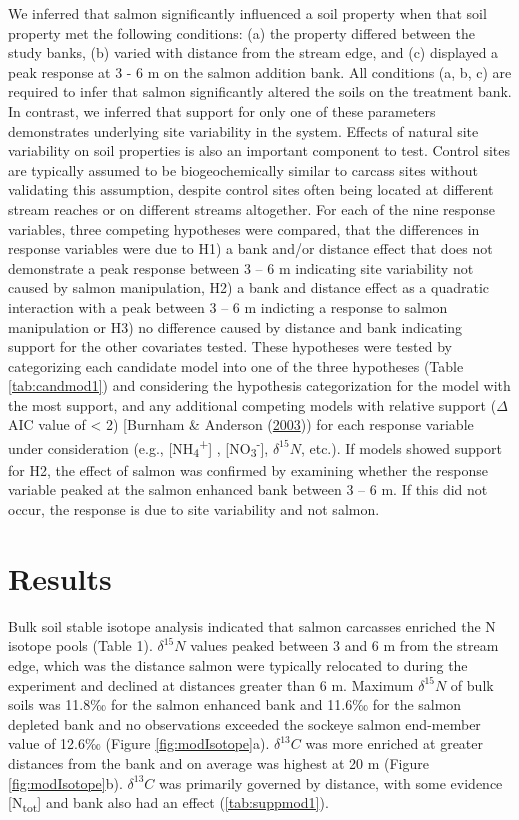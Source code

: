 \documentclass [11pt, proquest] {uwthesis}[2015/03/03]
\begin{document}
We inferred that salmon significantly influenced a soil property when
that soil property met the following conditions: (a) the property
differed between the study banks, (b) varied with distance from the
stream edge, and (c) displayed a peak response at 3 - 6 m on the salmon
addition bank. All conditions (a, b, c) are required to infer that
salmon significantly altered the soils on the treatment bank. In
contrast, we inferred that support for only one of these parameters
demonstrates underlying site variability in the system. Effects of
natural site variability on soil properties is also an important
component to test. Control sites are typically assumed to be
biogeochemically similar to carcass sites without validating this
assumption, despite control sites often being located at different
stream reaches or on different streams altogether. For each of the nine
response variables, three competing hypotheses were compared, that the
differences in response variables were due to H1) a bank and/or distance
effect that does not demonstrate a peak response between 3 -- 6 m
indicating site variability not caused by salmon manipulation, H2) a
bank and distance effect as a quadratic interaction with a peak between
3 -- 6 m indicting a response to salmon manipulation or H3) no
difference caused by distance and bank indicating support for the other
covariates tested. These hypotheses were tested by categorizing each
candidate model into one of the three hypotheses (Table
\ref{tab:candmod1}) and considering the hypothesis categorization for
the model with the most support, and any additional competing models
with relative support (\(\Delta\)AIC value of \textless{} 2) {[}Burnham
\& Anderson (\protect\hyperlink{ref-Burnham2003}{2003})) for each
response variable under consideration (e.g.,
{[}NH\textsubscript{4}\textsuperscript{+}{]} ,
{[}NO\textsubscript{3}\textsuperscript{-}{]}, \(\delta^{15}N\), etc.).
If models showed support for H2, the effect of salmon was confirmed by
examining whether the response variable peaked at the salmon enhanced
bank between 3 -- 6 m. If this did not occur, the response is due to
site variability and not salmon.

\section{Results}\label{results}

Bulk soil stable isotope analysis indicated that salmon carcasses
enriched the N isotope pools (Table 1). \(\delta^{15}N\) values peaked
between 3 and 6 m from the stream edge, which was the distance salmon
were typically relocated to during the experiment and declined at
distances greater than 6 m. Maximum \(\delta^{15}N\) of bulk soils was
11.8‰ for the salmon enhanced bank and 11.6‰ for the salmon depleted
bank and no observations exceeded the sockeye salmon end-member value of
12.6‰ (Figure \ref{fig:modIsotope}a). \(\delta^{13}C\) was more enriched
at greater distances from the bank and on average was highest at 20 m
(Figure \ref{fig:modIsotope}b). \(\delta^{13}C\) was primarily governed
by distance, with some evidence {[}N\textsubscript{tot}{]} and bank also
had an effect (\ref{tab:suppmod1}).
\end{document}
